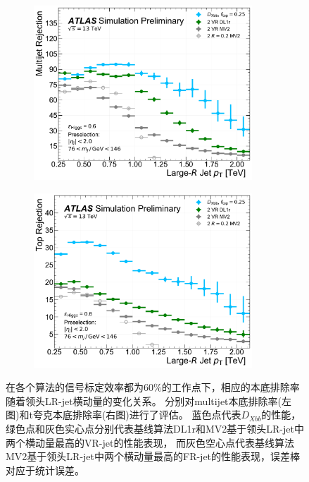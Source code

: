 \begin{figure}[!thbp]
  \begin{subfigure}{.5\textwidth}
  \centering
  \includegraphics[width=0.9\textwidth]{figuresXbb/pulled/eff_vs_pt/const_eff_60/dijet.pdf}
  \caption{}
  \end{subfigure}
  \begin{subfigure}{.5\textwidth}
  \centering
  \includegraphics[width=0.9\textwidth]{figuresXbb/pulled/eff_vs_pt/const_eff_60/top.pdf}
  \caption{}
  \end{subfigure}
  \caption{
  在各个算法的信号标定效率都为$60\%$的工作点下，相应的本底排除率随着领头LR-jet横动量的变化关系。
  分别对multijet本底排除率(左图)和t夸克本底排除率(右图)进行了评估。
  蓝色点代表$D_{Xbb}$的性能，绿色点和灰色实心点分别代表基线算法DL1r和MV2基于领头LR-jet中两个横动量最高的VR-jet的性能表现，
而灰色空心点代表基线算法MV2基于领头LR-jet中两个横动量最高的FR-jet的性能表现，误差棒对应于统计误差。
  }
\label{fig:PT60}
\end{figure}

